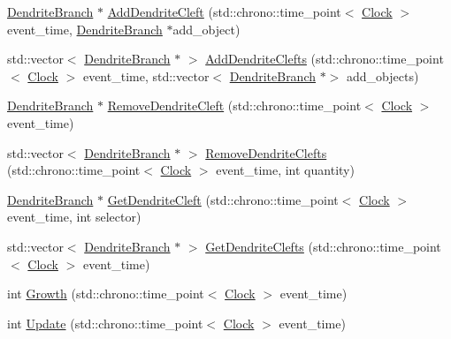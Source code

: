 \begin{DoxyCompactItemize}
\item 
\mbox{\hyperlink{class_dendrite_branch}{Dendrite\+Branch}} $\ast$ \mbox{\hyperlink{class_dendrite_branch_a060f0c55b2e6cb65b68e160df0bbf563}{Add\+Dendrite\+Cleft}} (std\+::chrono\+::time\+\_\+point$<$ \mbox{\hyperlink{universe_8h_a0ef8d951d1ca5ab3cfaf7ab4c7a6fd80}{Clock}} $>$ event\+\_\+time, \mbox{\hyperlink{class_dendrite_branch}{Dendrite\+Branch}} $\ast$add\+\_\+object)
\item 
std\+::vector$<$ \mbox{\hyperlink{class_dendrite_branch}{Dendrite\+Branch}} $\ast$ $>$ \mbox{\hyperlink{class_dendrite_branch_a2ddeff41db805e414c994ac169cbcf4b}{Add\+Dendrite\+Clefts}} (std\+::chrono\+::time\+\_\+point$<$ \mbox{\hyperlink{universe_8h_a0ef8d951d1ca5ab3cfaf7ab4c7a6fd80}{Clock}} $>$ event\+\_\+time, std\+::vector$<$ \mbox{\hyperlink{class_dendrite_branch}{Dendrite\+Branch}} $\ast$$>$ add\+\_\+objects)
\item 
\mbox{\hyperlink{class_dendrite_branch}{Dendrite\+Branch}} $\ast$ \mbox{\hyperlink{class_dendrite_branch_afaca221cb4bba98e56f11b0f9e6370b5}{Remove\+Dendrite\+Cleft}} (std\+::chrono\+::time\+\_\+point$<$ \mbox{\hyperlink{universe_8h_a0ef8d951d1ca5ab3cfaf7ab4c7a6fd80}{Clock}} $>$ event\+\_\+time)
\item 
std\+::vector$<$ \mbox{\hyperlink{class_dendrite_branch}{Dendrite\+Branch}} $\ast$ $>$ \mbox{\hyperlink{class_dendrite_branch_acd54003e5acb9abda7d7a42f248c14b0}{Remove\+Dendrite\+Clefts}} (std\+::chrono\+::time\+\_\+point$<$ \mbox{\hyperlink{universe_8h_a0ef8d951d1ca5ab3cfaf7ab4c7a6fd80}{Clock}} $>$ event\+\_\+time, int quantity)
\item 
\mbox{\hyperlink{class_dendrite_branch}{Dendrite\+Branch}} $\ast$ \mbox{\hyperlink{class_dendrite_branch_a11f25ffce77011afad909acb593d2e42}{Get\+Dendrite\+Cleft}} (std\+::chrono\+::time\+\_\+point$<$ \mbox{\hyperlink{universe_8h_a0ef8d951d1ca5ab3cfaf7ab4c7a6fd80}{Clock}} $>$ event\+\_\+time, int selector)
\item 
std\+::vector$<$ \mbox{\hyperlink{class_dendrite_branch}{Dendrite\+Branch}} $\ast$ $>$ \mbox{\hyperlink{class_dendrite_branch_a2be44a81b4b5213947e9545400a0453c}{Get\+Dendrite\+Clefts}} (std\+::chrono\+::time\+\_\+point$<$ \mbox{\hyperlink{universe_8h_a0ef8d951d1ca5ab3cfaf7ab4c7a6fd80}{Clock}} $>$ event\+\_\+time)
\item 
int \mbox{\hyperlink{class_dendrite_branch_a4b950ef8a0856a11240d353bcfd1fba4}{Growth}} (std\+::chrono\+::time\+\_\+point$<$ \mbox{\hyperlink{universe_8h_a0ef8d951d1ca5ab3cfaf7ab4c7a6fd80}{Clock}} $>$ event\+\_\+time)
\item 
int \mbox{\hyperlink{class_dendrite_branch_a8540dfafeb5bd45f782ab31b8231b10f}{Update}} (std\+::chrono\+::time\+\_\+point$<$ \mbox{\hyperlink{universe_8h_a0ef8d951d1ca5ab3cfaf7ab4c7a6fd80}{Clock}} $>$ event\+\_\+time)
\end{DoxyCompactItemize}
